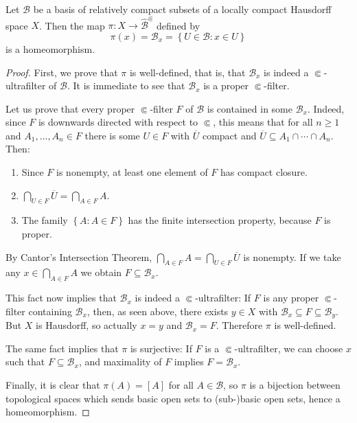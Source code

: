 \begin{theorem}\label{theoremrecoverxfromultrafilters}
Let $\mathcal{B}$ be a basis of relatively compact subsets of a locally compact Hausdorff space $X$. Then the map $\pi:X\to\widehat{\mathcal{B}}^\Subset$ defined by
\[\pi(x)=\mathcal{B}_x=\left\{U\in\mathcal{B}:x\in U\right\}\]
is a homeomorphism.
\end{theorem}
\begin{proof}
First, we prove that $\pi$ is well-defined, that is, that $\mathcal{B}_x$ is indeed a $\Subset$-ultrafilter of $\mathcal{B}$. It is immediate to see that $\mathcal{B}_x$ is a proper $\Subset$-filter.

Let us prove that every proper $\Subset$-filter $F$ of $\mathcal{B}$ is contained in some $\mathcal{B}_x$. Indeed, since $F$ is downwards directed with respect to $\Subset$, this means that for all $n\geq 1$ and $A_1,\ldots,A_n\in F$ there is some $U\in F$ with $\overline{U}$ compact and $\overline{U}\subseteq A_1\cap\cdots\cap A_n$. Then:
\begin{enumerate}
\item[(i)] Since $F$ is nonempty, at least one element of $F$ has compact closure.
\item[(ii)] $\bigcap_{U\in F}\overline{U}=\bigcap_{A\in F}A$.
\item[(iii)] The family $\left\{A:A\in F\right\}$ has the finite intersection property, because $F$ is proper.
\end{enumerate}

By Cantor's Intersection Theorem, $\bigcap_{A\in F}A=\bigcap_{U\in F}\overline{U}$ is nonempty. If we take any $x\in\bigcap_{A\in F}A$ we obtain $F\subseteq\mathcal{B}_x$.

This fact now implies that $\mathcal{B}_x$ is indeed a $\Subset$-ultrafilter: If $F$ is any proper $\Subset$-filter containing $\mathcal{B}_x$, then, as seen above, there exists $y\in X$ with $\mathcal{B}_x\subseteq F\subseteq\mathcal{B}_y$. But $X$ is Hausdorff, so actually $x=y$ and $\mathcal{B}_x=F$. Therefore $\pi$ is well-defined.

The same fact implies that $\pi$ is surjective: If $F$ is a $\Subset$-ultrafilter, we can choose $x$ such that $F\subseteq\mathcal{B}_x$, and maximality of $F$ implies $F=\mathcal{B}_x$.

Finally, it is clear that $\pi(A)=[A]$ for all $A\in\mathcal{B}$, so $\pi$ is a bijection between topological spaces which sends basic open sets to (sub-)basic open sets, hence a homeomorphism.\qedhere
\end{proof}

